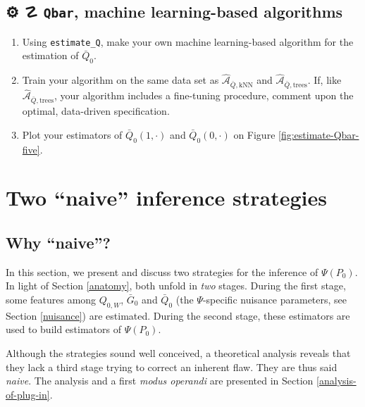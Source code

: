\documentclass[11pt,openright,twoside]{book}
\newcommand{\gear}{\usebox{\gearbox}\;}
\DeclareRobustCommand{\stixdanger}{%
  {\usefont{U}{stixbbit}{m}{it}\symbol{"F6}}%
}
\newcommand{\Algo}{\widehat{\mathcal{A}}}
\newcommand{\Gbar}{\bar{G}}
\newcommand{\Qbar}{\bar{Q}}
\theoremstyle{definition}
\theoremstyle{definition}
\theoremstyle{definition}
\theoremstyle{remark}
\begin{document}
\hypertarget{nuisance-Qbar-ml-exo}{%
\section{\texorpdfstring{⚙ \gear ☡ \stixdanger{} \texttt{Qbar}, machine learning-based algorithms}{⚙ ☡  Qbar, machine learning-based algorithms}}\label{nuisance-Qbar-ml-exo}}

\begin{enumerate}
\def\labelenumi{\arabic{enumi}.}
\item
  Using \texttt{estimate\_Q}, make your own machine learning-based algorithm for the
  estimation of \(\Qbar_{0}\).
\item
  Train your algorithm on the same data set as \(\Algo_{\Qbar,\text{kNN}}\) and
  \(\Algo_{\Qbar,\text{trees}}\). If, like \(\Algo_{\Qbar,\text{trees}}\), your
  algorithm includes a fine-tuning procedure, comment upon the optimal,
  data-driven specification.
\item
  Plot your estimators of \(\Qbar_{0}(1,\cdot)\) and \(\Qbar_{0}(0,\cdot)\) on
  Figure \ref{fig:estimate-Qbar-five}.
\end{enumerate}



\hypertarget{naive-estimators}{%
\chapter{Two ``naive'' inference strategies}\label{naive-estimators}}

\hypertarget{why-naive}{%
\section{Why ``naive''?}\label{why-naive}}

In this section, we present and discuss two strategies for the inference of
\(\Psi(P_{0})\). In light of Section \ref{anatomy}, both unfold in \emph{two}
stages. During the first stage, some features among \(Q_{0,W}\), \(\Gbar_{0}\)
and \(\Qbar_{0}\) (the \(\Psi\)-specific nuisance parameters, see Section
\ref{nuisance}) are estimated. During the second
stage, these estimators are used to build estimators of \(\Psi(P_{0})\).

Although the strategies sound well conceived, a theoretical analysis reveals
that they lack a third stage trying to correct an inherent flaw. They are thus
said \emph{naive}. The analysis and a first \emph{modus operandi} are presented in
Section \ref{analysis-of-plug-in}.
\end{document}
